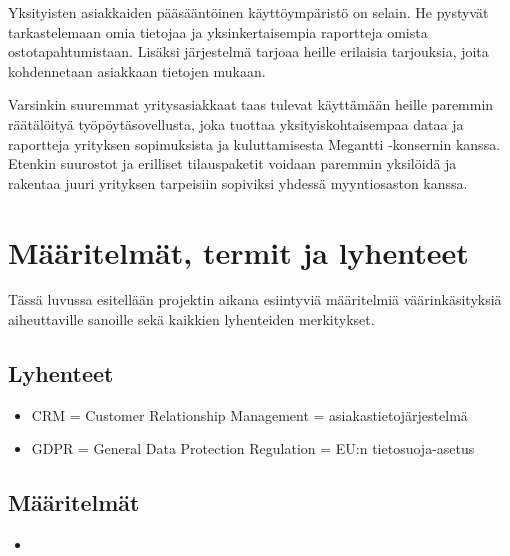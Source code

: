         Yksityisten asiakkaiden pääsääntöinen käyttöympäristö on selain. He pystyvät tarkastelemaan omia tietojaa ja yksinkertaisempia raportteja omista 
        ostotapahtumistaan. Lisäksi järjestelmä tarjoaa heille erilaisia tarjouksia, joita kohdennetaan asiakkaan tietojen mukaan.

        Varsinkin suuremmat yritysasiakkaat taas tulevat käyttämään heille paremmin räätälöityä työpöytäsovellusta, joka tuottaa yksityiskohtaisempaa
        dataa ja raportteja yrityksen sopimuksista ja kuluttamisesta Megantti -konsernin kanssa. Etenkin suurostot ja erilliset tilauspaketit 
        voidaan paremmin yksilöidä ja rakentaa juuri yrityksen tarpeisiin sopiviksi yhdessä myyntiosaston kanssa.


\section{Määritelmät, termit ja lyhenteet}

    Tässä luvussa esitellään projektin aikana esiintyviä määritelmiä väärinkäsityksiä aiheuttaville sanoille sekä kaikkien lyhenteiden merkitykset.

    \subsection{Lyhenteet}
        \begin{itemize}
            \item CRM = Customer Relationship Management = asiakastietojärjestelmä
            \item GDPR = General Data Protection Regulation = EU:n tietosuoja-asetus
            
        \end{itemize}

    \subsection{Määritelmät}
        \begin{itemize}
            \item 
            
        \end{itemize}

    

